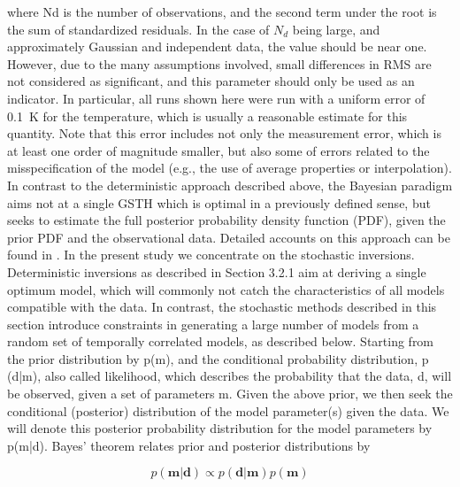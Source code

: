 \documentclass[cp]{copernicus}
\begin{document}
where Nd is the number of observations, and the second term under the root is the sum of 
standardized residuals. In the case of $N_d$ being large, and approximately Gaussian and independent 
data, the value should be near one. However, due to the many assumptions involved, small differences 
in RMS are not considered as significant, and this parameter should only be used as an indicator. In 
particular, all runs shown here were run with a uniform error of 0.1~K for the temperature, which is 
usually a reasonable estimate for this quantity. Note that this error includes not only the 
measurement error, which is at least one order of magnitude smaller, but also some of errors 
related to the misspecification of the model (e.g., the use of average properties or interpolation).
In contrast to the deterministic approach described above, the Bayesian paradigm \cite[see, 
e.g.][]{Gelman2013a} aims not at a single GSTH which is optimal in a previously defined sense, but 
seeks to estimate the full posterior probability density function (PDF), given the prior PDF and the 
observational data. Detailed accounts on this approach can be found in 
\citep{Mosegaard1995a,Mosegaard2002a,Tarantola2005a}. In the present study we concentrate on the 
stochastic inversions. Deterministic inversions as described in Section 3.2.1 aim at deriving a 
single optimum model, which will commonly not catch the characteristics of all models compatible 
with the data. In contrast, the stochastic methods described in this section introduce constraints 
in generating a large number of models from a random set of temporally correlated models, as 
described below. Starting from the prior distribution by p(m), and the conditional probability 
distribution, p (d|m), also called likelihood, which describes the probability that the data, d, 
will be observed, given a set of parameters m. Given the above prior, we then seek the conditional 
(posterior) distribution of the model parameter(s) given the data. We will denote this posterior 
probability distribution for the model parameters by p(m|d). Bayes’ theorem relates prior and 
posterior distributions by
 
\begin{equation}\label{eqn:12}
p\left( {{\mathbf{m}}\left| {\mathbf{d}} \right.} \right) \propto p\left( 
{{\mathbf{d}}\left| {\mathbf{m}} \right.} \right)p\left( {\mathbf{m}} \right)
\end{equation} 
\end{document}
